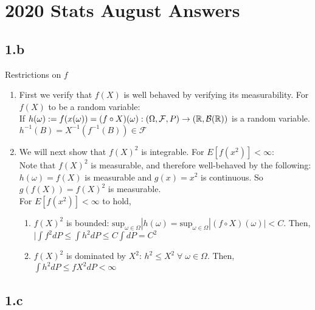 \section{2020 Stats August Answers}
\subsection{1.b}
Restrictions on \(f\)
\begin{enumerate}
    \item First we verify that \(f(X)\) is well behaved by verifying its measurability.  For \(f(X)\) to be a random variable: \\
    If $h(\omega):= f(x(\omega))=(f\circ X)(\omega): (\Omega,\mathcal{F},P)\rightarrow({\Bbb R},\mathcal{B}({\Bbb R}))$ is a random variable. \\
    \(h^{-1}(B)=X^{-1}(f^{-1}(B)) \in \mathcal{F}\)
    \item We will next show that \(f(X)^2\) is integrable.  For \(E[f(x^2)]<\infty\): \\
    Note that \(f(X)^2\) is measurable, and therefore well-behaved by the following: \(h(\omega)=f(X)\) is measurable and \(g(x)=x^2\) is continuous.  So \(g(f(X))=f(X)^2\) is measurable.\\
    For \(E[f(x^2)]<\infty\) to hold,
    \begin{enumerate}
        \item \(f(X)^2\) is bounded: \(\text{sup}_{\omega \in \Omega}|h(\omega)= \text{sup}_{\omega \in \Omega}|(f\circ X)(\omega)|<C\).  Then, \\
        \(|\int f^2 dP \leq \int h^2 dP \leq C \int dP = C^2\)
        \item \(f(X)^2\) is dominated by \(X^2\): \(h^2 \leq X^2 \;\forall\;\omega\in\Omega\).  Then, \\
        \(\int h^2 dP \leq fX^2 dP < \infty\)
    \end{enumerate}
\end{enumerate}
\subsection{1.c}

